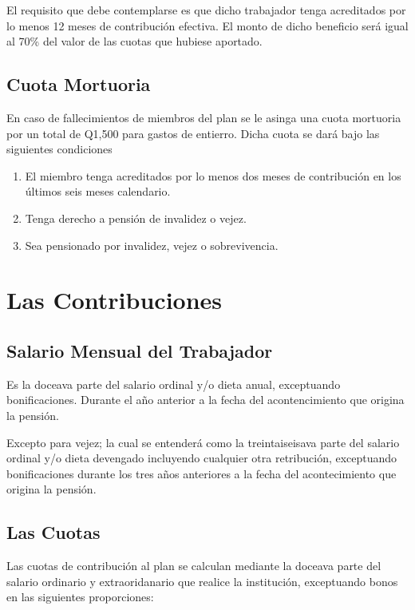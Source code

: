 \documentclass[12pt,letterpaper,titlepage]{article}
\begin{document}
El requisito que debe contemplarse es que dicho trabajador tenga acreditados por lo menos 12 meses de contribución efectiva. El monto de dicho beneficio será igual al 70\% del valor de las cuotas que hubiese aportado.

\subsection{Cuota Mortuoria}

En caso de fallecimientos de miembros del plan se le asinga una cuota mortuoria por un total de Q1,500 para gastos de entierro. Dicha cuota se dará bajo las siguientes condiciones 

\begin{enumerate}
	\item El miembro tenga acreditados por lo menos dos meses de contribución en los últimos seis meses calendario.
	\item Tenga derecho a pensión de invalidez o vejez.
	\item Sea pensionado por invalidez, vejez o sobrevivencia.
\end{enumerate}


\newpage

\section{Las Contribuciones}

\subsection{Salario Mensual del Trabajador}

Es la doceava parte del salario ordinal y/o dieta anual, exceptuando bonificaciones. Durante el año anterior a la fecha del acontencimiento que origina la pensión. 

Excepto para vejez; la cual se entenderá como la treintaiseisava parte del salario ordinal y/o dieta devengado incluyendo cualquier otra retribución, exceptuando bonificaciones durante los tres años anteriores a la fecha del acontecimiento que origina la pensión.

\subsection{Las Cuotas}

Las cuotas de contribución al plan se calculan mediante la doceava parte del salario ordinario y extraoridanario que realice la institución, exceptuando bonos en las siguientes proporciones:
\end{document}
